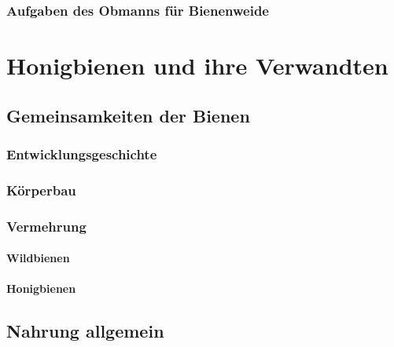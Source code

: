 \documentclass[
]{book}
\begin{document}
\hypertarget{aufgaben-des-obmanns-fuxfcr-bienenweide}{%
\subsection{Aufgaben des Obmanns für Bienenweide}\label{aufgaben-des-obmanns-fuxfcr-bienenweide}}

\hypertarget{honigbienen-und-ihre-verwandten}{%
\chapter{Honigbienen und ihre Verwandten}\label{honigbienen-und-ihre-verwandten}}

\hypertarget{gemeinsamkeiten-der-bienen}{%
\section{Gemeinsamkeiten der Bienen}\label{gemeinsamkeiten-der-bienen}}

\hypertarget{entwicklungsgeschichte}{%
\subsection{Entwicklungsgeschichte}\label{entwicklungsgeschichte}}

\hypertarget{kuxf6rperbau}{%
\subsection{Körperbau}\label{kuxf6rperbau}}

\hypertarget{vermehrung}{%
\subsection{Vermehrung}\label{vermehrung}}

\hypertarget{wildbienen}{%
\subsubsection{Wildbienen}\label{wildbienen}}

\hypertarget{honigbienen}{%
\subsubsection{Honigbienen}\label{honigbienen}}

\hypertarget{nahrung-allgemein}{%
\section{Nahrung allgemein}\label{nahrung-allgemein}}
\end{document}
